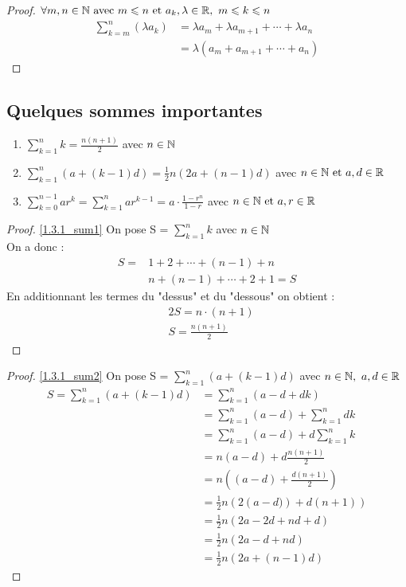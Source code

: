 \begin{proof}
	$\forall m, n \in \mathbb{N} \textnormal{ avec } m \leqslant n \textnormal{ et } a_k, \lambda \in \mathbb{R}, \ m \leqslant k \leqslant n$
	\begin{align*}
		\sum_{k = m}^{n} (\lambda a_k) &=  \lambda a_m + \lambda a_{m+1} + \cdots + \lambda a_n \\
		&= \lambda (a_m + a_{m+1} + \cdots + a_n)
	\end{align*}
\end{proof}
\subsection{Quelques sommes importantes}
\begin{enumerate}
	\item \label{1.3.1_sum1} $\displaystyle{\sum_{k = 1}^{n} k = \frac{n(n+1)}{2}}$ avec $n \in \mathbb{N}$
	\item \label{1.3.1_sum2} $\displaystyle{\sum_{k = 1}^{n}\left(a + \left(k - 1\right)d\right) = \frac{1}{2}n\left(2a + \left(n - 1\right)d\right)}$ avec $n \in \mathbb{N} \text{ et } a, d \in \mathbb{R}$
	\item \label{1.3.1_sum3} $\displaystyle{\sum_{k = 0}^{n-1}ar^k = \sum_{k = 1}^{n}ar^{k-1} = a \cdot \frac{1 - r^n}{1 - r}}$ avec $n \in \mathbb{N} \text{ et } a, r \in \mathbb{R}$
\end{enumerate}
\begin{proof}
	\ref{1.3.1_sum1} On pose S = $\displaystyle{\sum_{k = 1}^{n} k}$ avec $n \in \mathbb{N}$ \\
	On a donc :
	\begin{align*}
		S = & 1 + 2 + \cdots + (n - 1) + n \\
		& n + (n - 1) + \cdots + 2 + 1 = S 
	\end{align*}
	En additionnant les termes du "dessus" et du "dessous" on obtient :
	\begin{align*}
		&2S = n \cdot (n+1) \\
		&S = \frac{n(n+1)}{2}
	\end{align*}
\end{proof}

\begin{proof}
	\ref{1.3.1_sum2} On pose S = $\displaystyle{\sum_{k = 1}^{n}\left(a + \left(k - 1\right)d\right)}$ avec $n \in \mathbb{N},\ a, d \in \mathbb{R}$
	\begin{align*}
		S = \sum_{k = 1}^{n} \left(a + \left(k - 1\right)d\right) &= \sum_{k=1}^{n} (a - d + dk)\\
		&= \sum_{k=1}^{n} (a - d) + \sum_{k = 1}^{n} dk \\
		&= \sum_{k=1}^{n} (a - d) + d\sum_{k=1}^{n}k \\
		&= n(a - d) + d \frac{n(n + 1)}{2} \\
		&= n\left(\left(a - d\right) + \frac{d(n+1)}{2} \right) \\
		&= \frac{1}{2}n \left(2\left(a-d)\right) + d(n+1) \right) \\
		&= \frac{1}{2}n (2a - 2d + nd + d) \\
		&= \frac{1}{2}n (2a -d + nd) \\
		&= \frac{1}{2}n (2a + (n - 1)d)
	\end{align*}
\end{proof}

